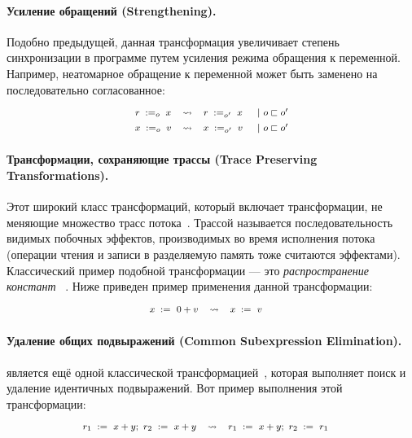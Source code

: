\paragraph{
Усиление обращений
(Strengthening).
}

Подобно предыдущей, данная трансформация 
увеличивает степень синхронизации в программе 
путем усиления режима обращения к переменной.
Например, неатомарное обращение к переменной  может быть заменено на 
последовательно согласованное: 
%
\[\def\arraystretch{1.4}\footnotesize
  \begin{array}{cccl} 

      \readInst{o}{r}{x} 
    & \leadsto 
    & \readInst{o'}{r}{x}
    & ~|~ o \sqsubset o' \\ 

      \writeInst{o}{x}{v}
    & \leadsto 
    & \writeInst{o'}{x}{v}
    & ~|~ o \sqsubset o'  \\ 

  \end{array}
\]

\paragraph{
Трансформации, сохраняющие трассы
(Trace Preserving Transformations).
}

Этот широкий класс трансформаций, который включает трансформации, 
не меняющие множество трасс потока~\cite{Sevcik-Aspinall:ECOOP08}.
Трассой называется последовательность видимых побочных эффектов,
производимых во время исполнения потока 
(операции чтения и записи в разделяемую память тоже считаются эффектами).
Классический пример подобной трансформации --- это \emph{распространение констант}%
~\cite{Muchnick:ACDI97, Wegman-Zadeck:TOPLAS91}.
Ниже приведен пример применения данной трансформации: 
%
\[\def\arraystretch{1.4}\footnotesize
  \begin{array}{cccl} 

      \writeInst{}{x}{0 + v} 
    & \leadsto 
    & \writeInst{}{x}{v}
    & \\ 

  \end{array}
\]
  
\paragraph{
Удаление общих подвыражений
(Common Subexpression Elimination).
}

\CSE является ещё одной классической трансформацией~\cite{Muchnick:ACDI97}, 
которая выполняет поиск и удаление идентичных подвыражений.
Вот пример выполнения этой трансформации:
%
\[\def\arraystretch{1.4}\footnotesize
  \begin{array}{cccl} 

      \readInst{}{r_1}{x + y} \seq \readInst{}{r_2}{x + y} 
    & \leadsto 
    & \readInst{}{r_1}{x + y} \seq \readInst{}{r_2}{r_1}
    & \\ 

  \end{array}
\]


